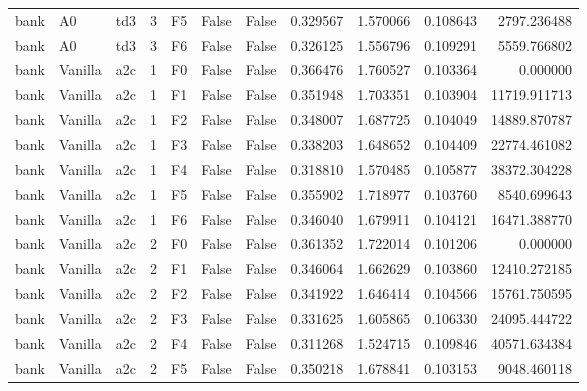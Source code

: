 \begin{tabular}{lllrlllrrrr}
      bank &      A0 &       td3 &     3 &  F5 &           False &            False &  0.329567 &  1.570066 & 0.108643 &      2797.236488 \\
      bank &      A0 &       td3 &     3 &  F6 &           False &            False &  0.326125 &  1.556796 & 0.109291 &      5559.766802 \\
      bank & Vanilla &       a2c &     1 &  F0 &           False &            False &  0.366476 &  1.760527 & 0.103364 &         0.000000 \\
      bank & Vanilla &       a2c &     1 &  F1 &           False &            False &  0.351948 &  1.703351 & 0.103904 &     11719.911713 \\
      bank & Vanilla &       a2c &     1 &  F2 &           False &            False &  0.348007 &  1.687725 & 0.104049 &     14889.870787 \\
      bank & Vanilla &       a2c &     1 &  F3 &           False &            False &  0.338203 &  1.648652 & 0.104409 &     22774.461082 \\
      bank & Vanilla &       a2c &     1 &  F4 &           False &            False &  0.318810 &  1.570485 & 0.105877 &     38372.304228 \\
      bank & Vanilla &       a2c &     1 &  F5 &           False &            False &  0.355902 &  1.718977 & 0.103760 &      8540.699643 \\
      bank & Vanilla &       a2c &     1 &  F6 &           False &            False &  0.346040 &  1.679911 & 0.104121 &     16471.388770 \\
      bank & Vanilla &       a2c &     2 &  F0 &           False &            False &  0.361352 &  1.722014 & 0.101206 &         0.000000 \\
      bank & Vanilla &       a2c &     2 &  F1 &           False &            False &  0.346064 &  1.662629 & 0.103860 &     12410.272185 \\
      bank & Vanilla &       a2c &     2 &  F2 &           False &            False &  0.341922 &  1.646414 & 0.104566 &     15761.750595 \\
      bank & Vanilla &       a2c &     2 &  F3 &           False &            False &  0.331625 &  1.605865 & 0.106330 &     24095.444722 \\
      bank & Vanilla &       a2c &     2 &  F4 &           False &            False &  0.311268 &  1.524715 & 0.109846 &     40571.634384 \\
      bank & Vanilla &       a2c &     2 &  F5 &           False &            False &  0.350218 &  1.678841 & 0.103153 &      9048.460118 \\

\end{tabular}
